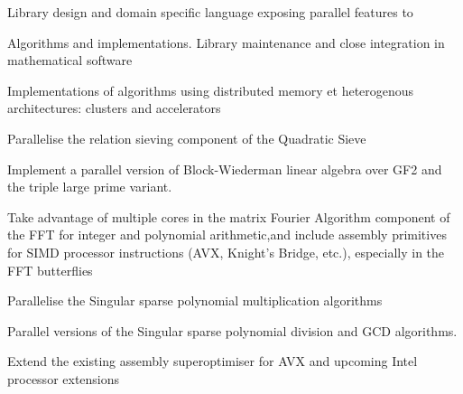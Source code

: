 \begin{workpackage}[id=hpc,wphases=0-48,
  title=High Performance Computing,
  PSRM=1, %
  LLRM=12, %
  SARM=18, %
  UKRM=1, %
  UBRM=1, %
  UJFRM=12]
\begin{wpdelivs}
  \begin{wpdeliv}[due=12,id=LinBox-DSL,dissem=PU,nature=R]
    {Library design and domain specific language exposing \Linbox parallel features to \Sage}
  \end{wpdeliv}
  \begin{wpdeliv}[due=24,id=LinBox-algo,dissem=PU,nature=DEM]
    {Algorithms and implementations. Library maintenance and close integration
      in mathematical software}
  \end{wpdeliv}
  \begin{wpdeliv}[due=36,id=LinBox-distributed,dissem=PU,nature=DEM]
    {Implementations of algorithms using distributed memory et heterogenous
      architectures: clusters and accelerators}
  \end{wpdeliv}
  \begin{wpdeliv}[due=3,id=QS-sieving,dissem=PU,nature=DEM]
      {Parallelise the relation sieving component of the Quadratic Sieve}
\end{wpdeliv}
  \begin{wpdeliv}[due=9,id=QS-linalg,dissem=PU,nature=DEM]
      {Implement a parallel version of Block-Wiederman linear algebra over GF2 and the triple large prime variant.}
\end{wpdeliv}
  \begin{wpdeliv}[due=12,id=FFT,dissem=PU,nature=DEM]
    {Take advantage of multiple cores in the matrix Fourier Algorithm component of the FFT
      for integer and polynomial arithmetic,and include assembly primitives for SIMD
      processor instructions (AVX, Knight's Bridge, etc.), especially in the FFT
      butterflies}
\end{wpdeliv}
  \begin{wpdeliv}[due=12,id=singular-polymul,dissem=PU,nature=DEM]
      {Parallelise the Singular sparse polynomial multiplication algorithms}
\end{wpdeliv}
  \begin{wpdeliv}[due=12,id=singular-polyarith,dissem=PU,nature=DEM]
      {Parallel versions of the Singular sparse polynomial division and GCD algorithms.}
\end{wpdeliv}
  \begin{wpdeliv}[due=12,id=MPIRsuperoptimiser,dissem=PU,nature=DEM]
      {Extend the existing assembly superoptimiser for AVX and upcoming Intel processor extensions}
\end{wpdeliv}
  \begin{wpdeliv}[due=24,id=MPIRprocessors,dissem=PU,nature=DEM]

\end{wpdeliv}
\end{wpdelivs}
\end{workpackage}
